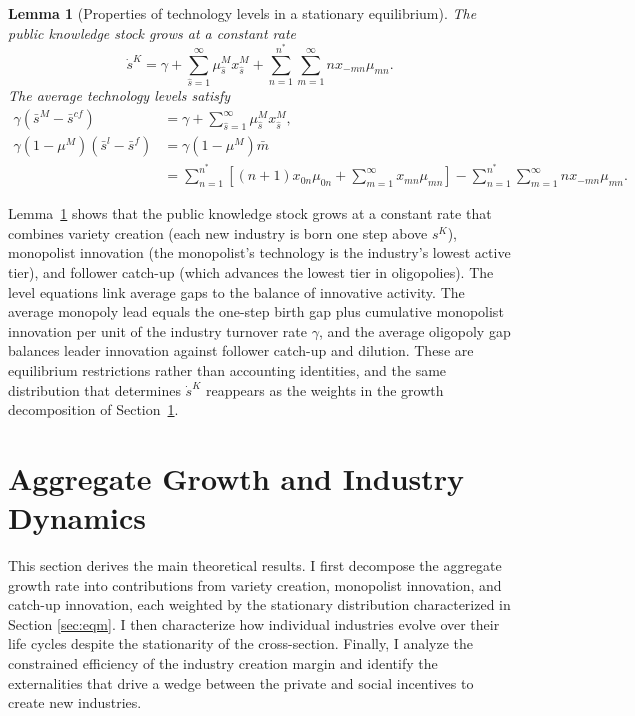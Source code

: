 \documentclass[12pt]{article}
\newtheorem{lemma}[proposition]{Lemma}
\begin{document}
\begin{lemma}[Properties of technology levels in a stationary equilibrium]\label{lem:levels}
    The public knowledge stock grows at a constant rate
\[\dot{s}^K = \gamma + \sum_{\hat{s}=1}^\infty \mu^M_{\hat{s}} x^M_{\hat{s}} + \sum_{n=1}^{n^\ast}\sum_{m=1}^\infty n x_{-mn} \mu_{mn}.\]
The average technology levels satisfy
\begin{align*}
\gamma(\bar{s}^M - \bar{s}^{cf}) &= \gamma + \sum_{\hat{s}=1}^\infty \mu^M_{\hat{s}} x^M_{\hat{s}},\\
\gamma(1-\mu^M)(\bar{s}^l - \bar{s}^f) &= \gamma(1-\mu^M)\bar{m} \\
&= \sum_{n=1}^{n^\ast} \left[ (n+1)x_{0n}\mu_{0n} + \sum_{m=1}^\infty x_{mn}\mu_{mn} \right] - \sum_{n=1}^{n^\ast}\sum_{m=1}^\infty n x_{-mn} \mu_{mn}.
\end{align*}
\end{lemma}

Lemma~\ref{lem:levels} shows that the public knowledge stock grows at a constant rate that combines variety creation (each new industry is born one step above \(s^K\)), monopolist innovation (the monopolist's technology is the industry's lowest active tier), and follower catch-up (which advances the lowest tier in oligopolies). The level equations link average gaps to the balance of innovative activity. The average monopoly lead equals the one-step birth gap plus cumulative monopolist innovation per unit of the industry turnover rate \(\gamma\), and the average oligopoly gap balances leader innovation against follower catch-up and dilution. These are equilibrium restrictions rather than accounting identities, and the same distribution that determines \(\dot{s}^K\) reappears as the weights in the growth decomposition of Section~\ref{sec:result}.

\section{Aggregate Growth and Industry Dynamics}\label{sec:result}

This section derives the main theoretical results. I first decompose the aggregate growth rate into contributions from variety creation, monopolist innovation, and catch-up innovation, each weighted by the stationary distribution characterized in Section \ref{sec:eqm}. I then characterize how individual industries evolve over their life cycles despite the stationarity of the cross-section. Finally, I analyze the constrained efficiency of the industry creation margin and identify the externalities that drive a wedge between the private and social incentives to create new industries.
\end{document}
